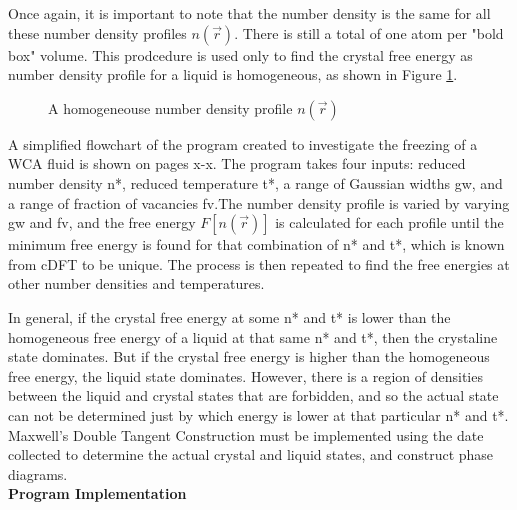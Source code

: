 \documentclass[12pt]{article}
\begin{document}
Once again, it is important to note that the number density is the same for all these number density profiles $n(\vec{r})$. There is still a total of one atom per "bold box" volume. This prodcedure is used only to find the crystal free energy as number density profile for a liquid is homogeneous, as shown in Figure \ref{fig:homogen_denisty}.  

 \begin{figure}[h!]
    \centering
    \caption{A homogeneouse number density profile $n(\vec{r})$}
    \label{fig:homogen_denisty}
  \end{figure}    
 
A simplified flowchart of the program created to investigate the freezing of a WCA fluid is shown on pages x-x. The program takes four inputs: reduced number density n*, reduced temperature t*, a range of Gaussian widths gw, and a range of fraction of vacancies fv.The number density profile is varied by varying gw and fv, and the free energy $F[n(\vec{r})]$ is calculated for each profile until the minimum free energy is found for that combination of n* and t*, which is known from cDFT to be unique. The process is then repeated to find the free energies at other number densities and temperatures. 

In general, if the crystal free energy at some n* and t* is lower than the homogeneous free energy of a liquid at that same n* and t*, then the crystaline state dominates. But if the crystal free energy is higher than the homogeneous free energy, the liquid state dominates. However, there is a region of densities between the liquid and crystal states that are forbidden, and so the actual state can not be determined just by which energy is lower at that particular n* and t*. Maxwell's Double Tangent Construction must be implemented using the date collected to determine the actual crystal and liquid states, and construct phase diagrams. 
\[{}\]
\textbf{Program Implementation}
\end{document}
